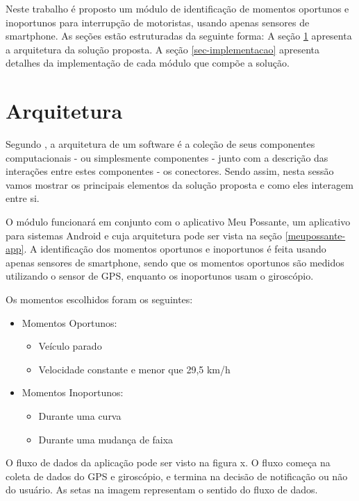 \label{proposta}

Neste trabalho é proposto um módulo de identificação de momentos oportunos e inoportunos para interrupção de
motoristas, usando apenas sensores de smartphone. As seções estão estruturadas da seguinte forma: A seção
\ref{sec-arquitetura-solucao} apresenta a arquitetura da solução proposta. A seção \ref{sec-implementacao}
apresenta detalhes da implementação de cada módulo que compõe a solução.

\section{Arquitetura}
\label{sec-arquitetura-solucao}
Segundo , a arquitetura de um software é a coleção de seus componentes computacionais - ou simplesmente
componentes - junto com a descrição das interações entre estes componentes - os conectores.  Sendo assim, nesta sessão
vamos mostrar os principais elementos da solução proposta e como eles interagem entre si.

O módulo funcionará em conjunto com o aplicativo Meu Possante, um aplicativo para sistemas Android e cuja arquitetura pode ser vista
na seção \ref{meupossante-app}. A identificação dos momentos oportunos e inoportunos é feita usando apenas sensores de smartphone,
sendo que os momentos oportunos são medidos utilizando o sensor de GPS, enquanto os inoportunos usam o giroscópio.

Os momentos escolhidos foram os seguintes:

\begin{itemize}
  \item Momentos Oportunos:
    \begin{itemize}
      \item Veículo parado \cite{kim2015sensors}
      \item Velocidade constante e menor que 29,5 km/h \cite{kim2015sensors}
    \end{itemize}
  \item Momentos Inoportunos:
    \begin{itemize}
      \item Durante uma curva \cite{monk2004recovering}
      \item Durante uma mudança de faixa \cite{monk2004recovering}
    \end{itemize}
\end{itemize}

O fluxo de dados da aplicação pode ser visto na figura x. O fluxo começa na coleta de dados do GPS e giroscópio, e termina
na decisão de notificação ou não do usuário. As setas na imagem representam o sentido do fluxo de dados.

